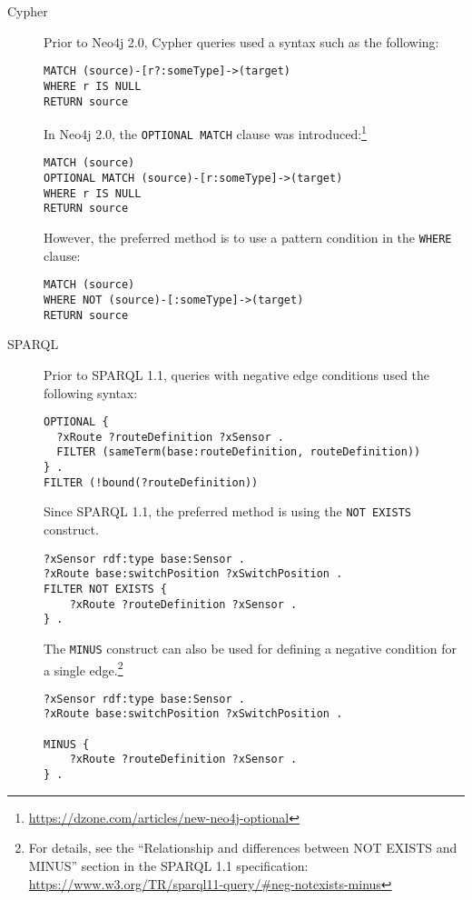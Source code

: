 \begin{description}
\item[Cypher] 
Prior to Neo4j 2.0, Cypher queries used a syntax such as the following:

\begin{lstlisting}[language=cypher]
MATCH (source)-[r?:someType]->(target)
WHERE r IS NULL
RETURN source
\end{lstlisting}

In Neo4j 2.0, the \lstinline[language=cypher]{OPTIONAL MATCH} clause was introduced:\footnote{\url{https://dzone.com/articles/new-neo4j-optional}}

\begin{lstlisting}[language=cypher]
MATCH (source)
OPTIONAL MATCH (source)-[r:someType]->(target)
WHERE r IS NULL
RETURN source
\end{lstlisting}

However, the preferred method is to use a pattern condition in the \lstinline[language=cypher]{WHERE} clause:

\begin{lstlisting}[language=cypher]
MATCH (source)
WHERE NOT (source)-[:someType]->(target)
RETURN source
\end{lstlisting}

\item[SPARQL]
Prior to SPARQL 1.1, queries with negative edge conditions used the following syntax:

\begin{lstlisting}[language=sparql]
OPTIONAL {
  ?xRoute ?routeDefinition ?xSensor .
  FILTER (sameTerm(base:routeDefinition, routeDefinition))
} .
FILTER (!bound(?routeDefinition))
\end{lstlisting}

Since SPARQL 1.1, the preferred method is using the \lstinline{NOT EXISTS} construct.


\begin{lstlisting}[language=sparql]
?xSensor rdf:type base:Sensor .
?xRoute base:switchPosition ?xSwitchPosition .
FILTER NOT EXISTS {
    ?xRoute ?routeDefinition ?xSensor .
} .
\end{lstlisting}

The \lstinline{MINUS} construct can also be used for defining a negative condition for a single edge.\footnote{For details, see the ``Relationship and differences between NOT EXISTS and MINUS'' section in the SPARQL 1.1 specification: \url{https://www.w3.org/TR/sparql11-query/\#neg-notexists-minus}}

\begin{lstlisting}[language=sparql]
?xSensor rdf:type base:Sensor .
?xRoute base:switchPosition ?xSwitchPosition .

MINUS {
    ?xRoute ?routeDefinition ?xSensor .
} .
\end{lstlisting}

\end{description}




